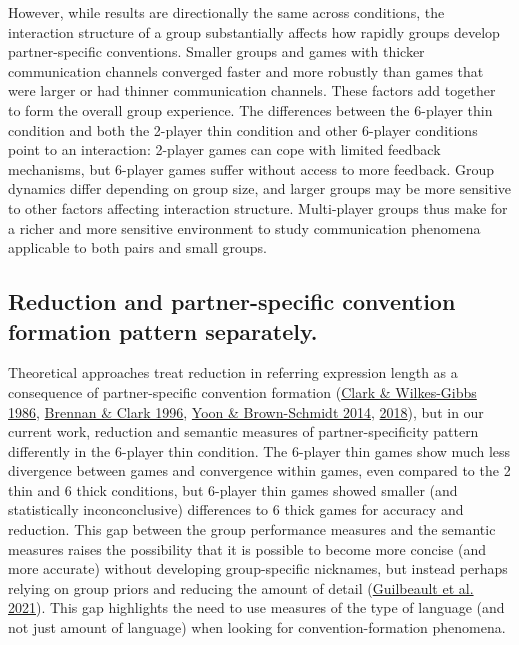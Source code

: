 \documentclass[
  english,
  a4paper,
]{article}
\begin{document}
However, while results are directionally the same across conditions, the interaction structure of a group substantially affects how rapidly groups develop partner-specific conventions. Smaller groups and games with thicker communication channels converged faster and more robustly than games that were larger or had thinner communication channels. These factors add together to form the overall group experience. The differences between the 6-player thin condition and both the 2-player thin condition and other 6-player conditions point to an interaction: 2-player games can cope with limited feedback mechanisms, but 6-player games suffer without access to more feedback. Group dynamics differ depending on group size, and larger groups may be more sensitive to other factors affecting interaction structure. Multi-player groups thus make for a richer and more sensitive environment to study communication phenomena applicable to both pairs and small groups.

\hypertarget{reduction-and-partner-specific-convention-formation-pattern-separately.}{%
\subsection{Reduction and partner-specific convention formation pattern separately.}\label{reduction-and-partner-specific-convention-formation-pattern-separately.}}

Theoretical approaches treat reduction in referring expression length as a consequence of partner-specific convention formation (\protect\hyperlink{ref-clark1986}{Clark \& Wilkes-Gibbs 1986}, \protect\hyperlink{ref-brennan1996}{Brennan \& Clark 1996}, \protect\hyperlink{ref-yoon2014}{Yoon \& Brown-Schmidt 2014}, \protect\hyperlink{ref-yoon2018}{2018}), but in our current work, reduction and semantic measures of partner-specificity pattern differently in the 6-player thin condition. The 6-player thin games show much less divergence between games and convergence within games, even compared to the 2 thin and 6 thick conditions, but 6-player thin games showed smaller (and statistically inconconclusive) differences to 6 thick games for accuracy and reduction. This gap between the group performance measures and the semantic measures raises the possibility that it is possible to become more concise (and more accurate) without developing group-specific nicknames, but instead perhaps relying on group priors and reducing the amount of detail (\protect\hyperlink{ref-guilbeault2021}{Guilbeault et al. 2021}). This gap highlights the need to use measures of the type of language (and not just amount of language) when looking for convention-formation phenomena.
\end{document}
